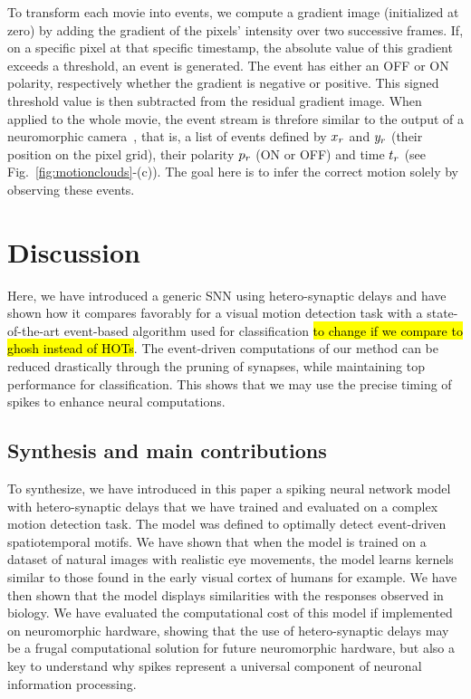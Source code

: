 \documentclass[default]{sn-jnl}%
\theoremstyle{thmstyleone}%
\theoremstyle{thmstyletwo}%
\theoremstyle{thmstylethree}%
\newcommand{\seeFig}[1]{see Fig.~\ref{fig:#1}}%
\DeclareRobustCommand{\note}[1]{{\sethlcolor{yellow}\hl{#1}}}
\begin{document}
To transform each movie into events, we compute a gradient image (initialized at zero) by adding the gradient of the pixels' intensity over two successive frames. If, on a specific pixel at that specific timestamp, the absolute value of this gradient exceeds a threshold, an event is generated. The event has either an OFF or ON polarity, respectively whether the gradient is negative or positive. This signed threshold value is then subtracted from the residual gradient image. When applied to the whole movie, the event stream is threfore similar to the output of a neuromorphic camera~\citep{rasetto_challenges_2022}, that is, a list of events defined by $x_r$ and $y_r$ (their position on the pixel grid), their polarity $p_r$ (ON or OFF) and time $t_r$  (\seeFig{motionclouds}-(c)). The goal here is to infer the correct motion solely by observing these events.
%
\section{Discussion}
Here, we have introduced a generic SNN using hetero-synaptic delays and have shown how it compares favorably for a visual motion detection task with a state-of-the-art event-based algorithm used for classification \note{to change if we compare to ghosh instead of HOTs}. The event-driven computations of our method can be reduced drastically through the pruning of synapses, while maintaining top performance for classification. This shows that we may use the precise timing of spikes to enhance neural computations. 
%
\subsection{Synthesis and main contributions}
To synthesize, we have introduced in this paper a spiking neural network model with hetero-synaptic delays that we have trained and evaluated on a complex motion detection task. The model was defined to optimally detect event-driven spatiotemporal motifs. We have shown that when the model is trained on a dataset of natural images with realistic eye movements, the model learns kernels similar to those found in the early visual cortex of humans for example. We have then shown that the model displays similarities with the responses observed in biology. We have evaluated the computational cost of this model if implemented on neuromorphic hardware, showing that the use of hetero-synaptic delays may be a frugal computational solution for future neuromorphic hardware, but also a key to understand why spikes represent a universal component of neuronal information processing.
\end{document}
